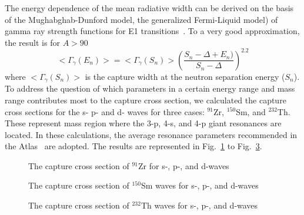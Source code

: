 \documentclass[twocolumn,amsmath,amssymb,10pt,groupedaddress,a4paper]{revtex4}
\begin{document}
The energy dependence of the mean radiative width can be derived on the basis of the
Mughabghab-Dunford model, the generalized Fermi-Liquid model) of gamma ray strength
functions for E1 transitions~\cite{Mughabghab:06b}. To a very good approximation,
the result is for $A>90$~\cite{Mughabghab:06b}
\begin{equation}
          <\Gamma_\gamma (E_n)>= <\Gamma_\gamma(S_n)>\left(\frac{S_n-\Delta +E_n)}{S_n-\Delta}\right)^{2.2}
\label{twopoittwo}
\end{equation}
\noindent where $<\Gamma_\gamma(S_n)>$ is the capture width at the neutron separation energy ($S_n$).
To address the question of which parameters in a certain energy range and mass
range contributes most to the capture cross section, we calculated the capture cross
sections for the s- p- and d- waves for three cases: $^{91}$Zr, $^{150}$Sm, and
$^{232}$Th. These represent mass region where the 3-p, 4-s, and 4-p giant resonances are located. In these calculations, the average resonance parameters recommended in the Atlas~\cite{Mughabghab:06} are adopted. The results are represented in Fig.~\ref{zr91a} to Fig.~\ref{th232}.

\begin{figure}[htbp]
\caption{The capture cross section of $^{91}$Zr for s-, p-, and d-waves}
\label{zr91a}
\end{figure}
\begin{figure}[htbp]
\caption{The capture cross section of $^{150}$Sm waves for s-, p-, and d-waves}
\label{sm150}
\end{figure}
\begin{figure}[htbp]
\caption{The capture cross section of $^{232}$Th waves for s-, p-, and d-waves}
\label{th232}
\end{figure}
\end{document}
